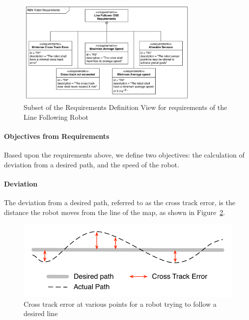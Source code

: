 \begin{figure}[htbp]
	\centering
	\includegraphics[width=0.8\textwidth]{figures/Robot_RDV}
\caption{Subset of the Requirements Definition View for requirements of the Line Following Robot}\label{fig:line_rdv}
\end{figure}



\paragraph{Objectives from Requirements}

Based upon the requirements above, we define two objectives: the calculation of deviation from a desired path, and the speed of the robot.

\paragraph{Deviation}

The deviation from a desired path, referred to as the cross track error, is the distance the robot moves from the line of the map, as shown in Figure~\ref{fig:crossTrackError}.

\begin{figure}[htbp]
	\centering
	\includegraphics[scale=0.8]{figures/crossTrackError}
\caption{Cross track error at various points for a robot trying to follow a desired line}\label{fig:crossTrackError}
\end{figure}

